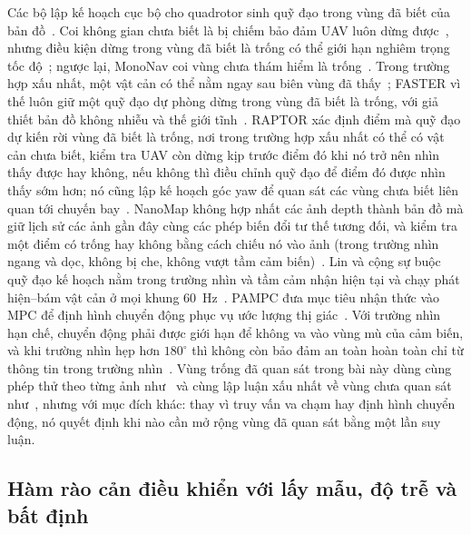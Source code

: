 \documentclass[11pt,a4paper]{article}
\theoremstyle{plain}
\theoremstyle{definition}
\theoremstyle{remark}
\begin{document}
Các bộ lập kế hoạch cục bộ cho quadrotor sinh quỹ đạo trong vùng đã biết của bản đồ~\cite{zhou2019}. Coi không gian chưa biết là bị chiếm bảo đảm UAV luôn dừng được~\cite{liu2016}, nhưng điều kiện dừng trong vùng đã biết là trống có thể giới hạn nghiêm trọng tốc độ~\cite{tordesillas2021}; ngược lại, MonoNav coi vùng chưa thám hiểm là trống~\cite{simon2023}. Trong trường hợp xấu nhất, một vật cản có thể nằm ngay sau biên vùng đã thấy~\cite{liu2016}; FASTER vì thế luôn giữ một quỹ đạo dự phòng dừng trong vùng đã biết là trống, với giả thiết bản đồ không nhiễu và thế giới tĩnh~\cite{tordesillas2021}. RAPTOR xác định điểm mà quỹ đạo dự kiến rời vùng đã biết là trống, nơi trong trường hợp xấu nhất có thể có vật cản chưa biết, kiểm tra UAV còn dừng kịp trước điểm đó khi nó trở nên nhìn thấy được hay không, nếu không thì điều chỉnh quỹ đạo để điểm đó được nhìn thấy sớm hơn; nó cũng lập kế hoạch góc yaw để quan sát các vùng chưa biết liên quan tới chuyến bay~\cite{zhou2021}. NanoMap không hợp nhất các ảnh depth thành bản đồ mà giữ lịch sử các ảnh gần đây cùng các phép biến đổi tư thế tương đối, và kiểm tra một điểm có trống hay không bằng cách chiếu nó vào ảnh (trong trường nhìn ngang và dọc, không bị che, không vượt tầm cảm biến)~\cite{florence2018}. Lin và cộng sự buộc quỹ đạo kế hoạch nằm trong trường nhìn và tầm cảm nhận hiện tại và chạy phát hiện--bám vật cản ở mọi khung 60~Hz~\cite{lin2020}. PAMPC đưa mục tiêu nhận thức vào MPC để định hình chuyển động phục vụ ước lượng thị giác~\cite{falanga2018}. Với trường nhìn hạn chế, chuyển động phải được giới hạn để không va vào vùng mù của cảm biến, và khi trường nhìn hẹp hơn $180^\circ$ thì không còn bảo đảm an toàn hoàn toàn chỉ từ thông tin trong trường nhìn~\cite{misyats2025}. Vùng trống đã quan sát trong bài này dùng cùng phép thử theo từng ảnh như~\cite{florence2018} và cùng lập luận xấu nhất về vùng chưa quan sát như~\cite{liu2016,tordesillas2021,zhou2021}, nhưng với mục đích khác: thay vì truy vấn va chạm hay định hình chuyển động, nó quyết định khi nào cần mở rộng vùng đã quan sát bằng một lần suy luận.

\subsection{Hàm rào cản điều khiển với lấy mẫu, độ trễ và bất định}
\end{document}
